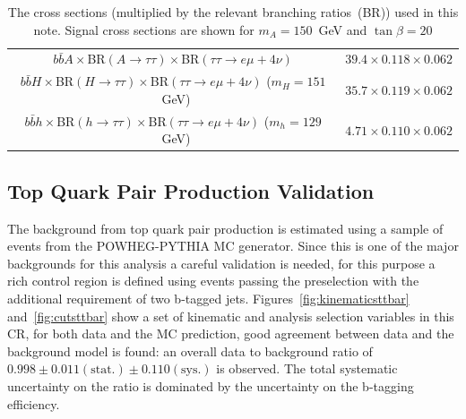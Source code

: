 \begin{table}[tp]
\begin{center}
\begin{footnotesize}
\begin{tabular}{cc}
$b\bar{b}A\times$BR$(A\rightarrow \tau\tau)\times$BR$(\tau\tau\rightarrow e\mu + 4\nu)$                       & $ 39.4 \times 0.118 \times 0.062$ \\
$b\bar{b}H\times$BR$(H\rightarrow \tau\tau)\times$BR$(\tau\tau\rightarrow e\mu+ 4\nu)$ ($m_H=151$~GeV)       & $ 35.7 \times 0.119 \times 0.062$ \\
$b\bar{b}h\times$BR$(h\rightarrow \tau\tau)\times$BR$(\tau\tau\rightarrow e\mu+ 4\nu)$ ($m_h=129$~GeV)       & $ 4.71 \times 0.110 \times 0.062$ \\
\hline \hline
\end{tabular}
\end{footnotesize}
\caption{The cross sections (multiplied by the relevant branching
  ratios~(BR)) used in this note. Signal cross sections are shown for $m_A=150$~GeV and $\tan\beta=20$}
\label{tab:MCxsec}

\end{center}
\end{table}


\subsection{Top Quark Pair Production Validation}
\label{sec:top_est}

The background from top quark pair production is estimated using a sample of events from the POWHEG-PYTHIA MC
generator. Since this is one of the major backgrounds for this analysis a careful validation is needed, for this purpose
 a \ttbar rich control region is defined using events passing 
the preselection  with the additional requirement of two b-tagged jets.
Figures~\ref{fig:kinematicsttbar} and~\ref{fig:cutsttbar} show a set of kinematic and analysis selection
variables in this CR, for both data and the MC prediction,  good agreement between data and the background model is found:
an overall data to background ratio of $0.998 \pm 0.011\mathrm{(stat.)} \pm 0.110 \mathrm{(sys.)}$ is observed. 
The total systematic uncertainty on the ratio is dominated by the uncertainty on the b-tagging efficiency. 
%

